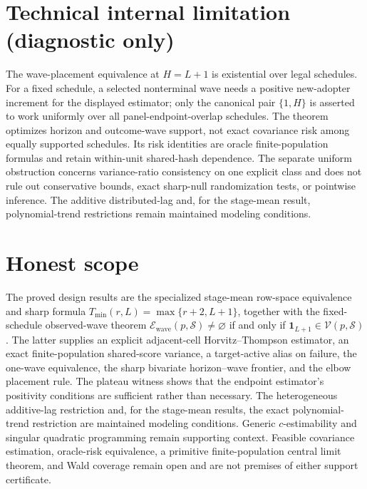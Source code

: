 \documentclass{article}
\begin{document}
\section*{Technical internal limitation (diagnostic only)}

The wave-placement equivalence at \(H=L+1\) is existential over legal schedules. For a fixed schedule, a selected nonterminal wave needs a positive new-adopter increment for the displayed estimator; only the canonical pair \(\{1,H\}\) is asserted to work uniformly over all panel-endpoint-overlap schedules. The theorem optimizes horizon and outcome-wave support, not exact covariance risk among equally supported schedules. Its risk identities are oracle finite-population formulas and retain within-unit shared-hash dependence. The separate uniform obstruction concerns variance-ratio consistency on one explicit class and does not rule out conservative bounds, exact sharp-null randomization tests, or pointwise inference. The additive distributed-lag and, for the stage-mean result, polynomial-trend restrictions remain maintained modeling conditions.

\section{Honest scope}

The proved design results are the specialized stage-mean row-space equivalence and sharp formula \(T_{\min}(r,L)=\max\{r+2,L+1\}\), together with the fixed-schedule observed-wave theorem \(\mathcal E_{\mathrm{wave}}(p,\mathcal S)\ne\varnothing\) if and only if \(\mathbf 1_{L+1}\in\mathcal V(p,\mathcal S)\). The latter supplies an explicit adjacent-cell Horvitz--Thompson estimator, an exact finite-population shared-score variance, a target-active alias on failure, the one-wave equivalence, the sharp bivariate horizon--wave frontier, and the elbow placement rule. The plateau witness shows that the endpoint estimator's positivity conditions are sufficient rather than necessary. The heterogeneous additive-lag restriction and, for the stage-mean results, the exact polynomial-trend restriction are maintained modeling conditions. Generic \(c\)-estimability and singular quadratic programming remain supporting context. Feasible covariance estimation, oracle-risk equivalence, a primitive finite-population central limit theorem, and Wald coverage remain open and are not premises of either support certificate.
\end{document}

